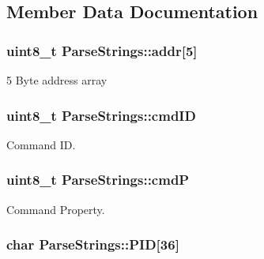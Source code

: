 \subsection{Member Data Documentation}
\subsubsection[{\texorpdfstring{addr}{addr}}]{\setlength{\rightskip}{0pt plus 5cm}uint8\+\_\+t Parse\+Strings\+::addr\mbox{[}5\mbox{]}\hspace{0.3cm}{\ttfamily [private]}}\hypertarget{classParseStrings_a0919816f131553dcd3706286e8bb61cc}{}\label{classParseStrings_a0919816f131553dcd3706286e8bb61cc}


5 Byte address array 

\subsubsection[{\texorpdfstring{cmd\+ID}{cmdID}}]{\setlength{\rightskip}{0pt plus 5cm}uint8\+\_\+t Parse\+Strings\+::cmd\+ID\hspace{0.3cm}{\ttfamily [private]}}\hypertarget{classParseStrings_a861e286994be25fad33c18c9be18ed12}{}\label{classParseStrings_a861e286994be25fad33c18c9be18ed12}


Command ID. 

\subsubsection[{\texorpdfstring{cmdP}{cmdP}}]{\setlength{\rightskip}{0pt plus 5cm}uint8\+\_\+t Parse\+Strings\+::cmdP\hspace{0.3cm}{\ttfamily [private]}}\hypertarget{classParseStrings_abd72bf6aef85d0c8d2bc5e145695c7f9}{}\label{classParseStrings_abd72bf6aef85d0c8d2bc5e145695c7f9}


Command Property. 

\subsubsection[{\texorpdfstring{P\+ID}{PID}}]{\setlength{\rightskip}{0pt plus 5cm}char Parse\+Strings\+::\+P\+ID\mbox{[}36\mbox{]}\hspace{0.3cm}{\ttfamily [private]}}\hypertarget{classParseStrings_a8a5bf86758a4cfaed5445aa9ad907afc}{}\label{classParseStrings_a8a5bf86758a4cfaed5445aa9ad907afc}


